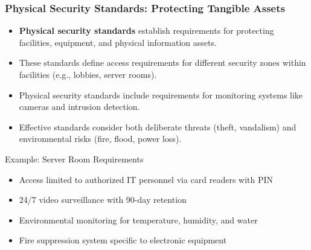 \documentclass{beamer}
\begin{document}
\begin{frame}
\frametitle{Physical Security Standards: Protecting Tangible Assets}
\begin{itemize}
\item \textbf{Physical security standards} establish requirements for protecting facilities, equipment, and physical information assets.
\item These standards define access requirements for different security zones within facilities (e.g., lobbies, server rooms).
\item Physical security standards include requirements for monitoring systems like cameras and intrusion detection.
\item Effective standards consider both deliberate threats (theft, vandalism) and environmental risks (fire, flood, power loss).
\end{itemize}

\begin{exampleblock}{Example: Server Room Requirements}
\scriptsize
\begin{itemize}
\item Access limited to authorized IT personnel via card readers with PIN
\item 24/7 video surveillance with 90-day retention
\item Environmental monitoring for temperature, humidity, and water
\item Fire suppression system specific to electronic equipment
\end{itemize}
\end{exampleblock}
\end{frame}
\end{document}
